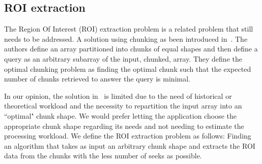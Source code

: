 \documentclass[sigconf, nonacm]{acmart}
\begin{document}

\subsection{ROI extraction}
The Region Of Interest (ROI) extraction problem is a related problem that still
needs to be addressed.
A solution using chunking as been introduced in~\cite{optimal_chuking}.
The authors define an array partitioned into chunks of equal shapes and then
define a query as an arbitrary subarray of the input, chunked, array.
They define the optimal chunking problem as finding the optimal chunk such
that the expected number of chunks retrieved to answer the query is minimal.

In our opinion, the solution in~\cite{optimal_chuking} is limited due to the
need of historical or theoretical workload and the necessity to repartition the
input array into an ``optimal" chunk shape.
We would prefer letting the application choose the appropriate chunk shape
regarding its needs and not needing to estimate the processing workload.
We define the ROI extraction problem as follows: Finding an algorithm that takes
as input an arbitrary chunk shape and extracts the ROI data from the chunks with
the less number of seeks as possible.



\end{document}
